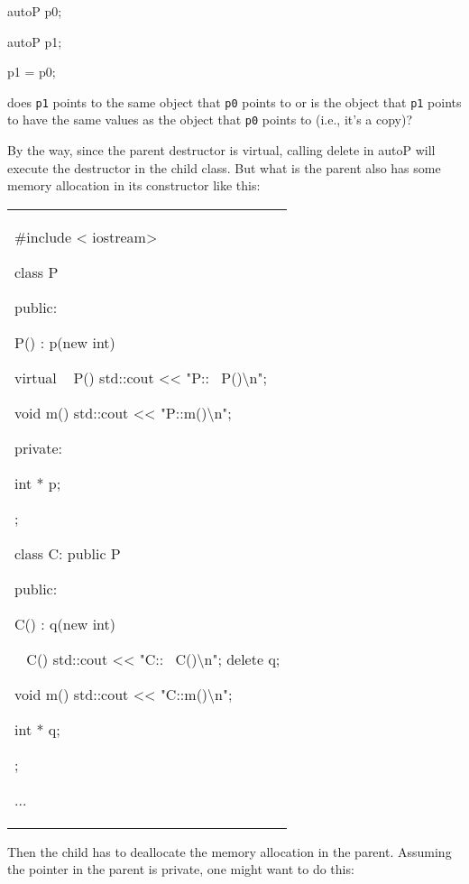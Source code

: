 autoP p0;

autoP p1;

p1 = p0;

does \texttt{p1} points to the same object that \texttt{p0} points to or is
the object that \texttt{p1} points to have the same values as the object
that \texttt{p0} points to (i.e., it's a copy)?

By the way, since the parent destructor is virtual, calling delete in
autoP will execute the destructor in the child class. But what is the
parent also has some memory allocation in its constructor like this:

\begin{longtable}[]{@{}
  >{\raggedright\arraybackslash}p{}@{}}
\toprule\noalign{}
 \\
\midrule\noalign{}
\endhead
\bottomrule\noalign{}
\endlastfoot
\#include < iostream\textgreater{}

class P

{

public:

P() : p(new int) {}

\textbf{ }virtual ~ P() { std::cout <<{}
"P::~ P()\textbackslash n"; }

void m() { std::cout <<{} "P::m()\textbackslash n"; }

private:

int * p;

};

class C: public P

{

public:

C() : q(new int) {}

~ C() { std::cout <<{}
"C::~ C()\textbackslash n"; delete q; }

void m() { std::cout <<{} "C::m()\textbackslash n"; }

int * q;

};

... \\
\end{longtable}

Then the child has to deallocate the memory allocation in the parent.
Assuming the pointer in the parent is private, one might want to do
this:

